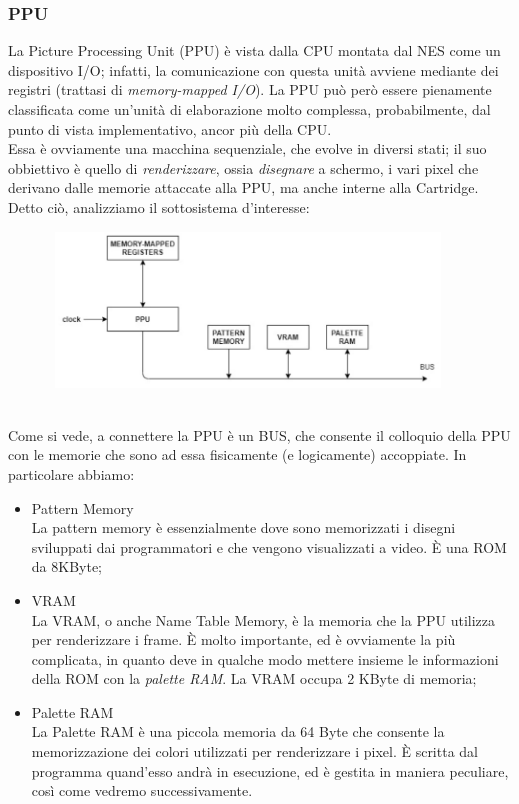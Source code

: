 \documentclass[11pt]{article}
\begin{document}
\subsubsection{PPU}
La Picture Processing Unit (PPU) è vista dalla CPU montata dal NES come un dispositivo I/O; infatti, la comunicazione con questa unità avviene mediante dei registri (trattasi di \emph{memory-mapped I/O}). La PPU può però essere pienamente classificata come un'unità di elaborazione molto complessa, probabilmente, dal punto di vista implementativo, ancor più della CPU.\\
Essa è ovviamente una macchina sequenziale, che evolve in diversi stati; il suo obbiettivo è quello di \emph{renderizzare}, ossia \emph{disegnare} a schermo, i vari pixel che derivano dalle memorie attaccate alla PPU, ma anche interne alla Cartridge. Detto ciò, analizziamo il sottosistema d'interesse:
\begin{figure}[h]
\hspace*{-2cm}
\centering
\includegraphics[width=400px, height=156px]{PPUARCH.jpg}
\end{figure}\\
Come si vede, a connettere la PPU è un BUS, che consente il colloquio della PPU con le memorie che sono ad essa fisicamente (e logicamente) accoppiate. In particolare abbiamo:
\begin{itemize}
	\item{
		Pattern Memory\\
		La pattern memory è essenzialmente dove sono memorizzati i disegni sviluppati dai programmatori e che vengono visualizzati a video. È una ROM da 8KByte;
	}
	\item{
		VRAM\\
		La VRAM, o anche Name Table Memory, è la memoria che la PPU utilizza per renderizzare i frame. È molto importante, ed è ovviamente la più complicata, in quanto deve in
		qualche modo mettere insieme le informazioni della ROM con la \emph{palette RAM}. La VRAM occupa 2 KByte di memoria;
	}
	\item{
		Palette RAM\\
		La Palette RAM è una piccola memoria da 64 Byte che consente la memorizzazione dei colori utilizzati per renderizzare i pixel. È scritta dal programma quand'esso andrà
		in esecuzione, ed è gestita in maniera peculiare, così come vedremo successivamente.
	}
\end{itemize}
\end{document}
